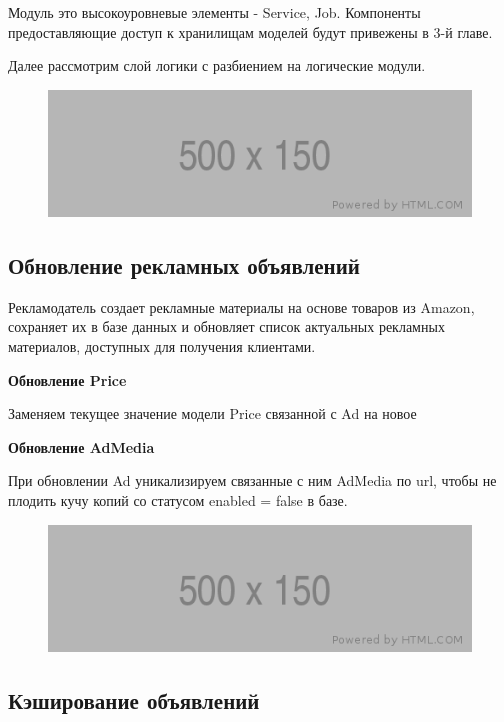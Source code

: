 \documentclass[times]{itmo-student-thesis}
\begin{document}
Модуль это высокоуровневые элементы - Service, Job. Компоненты предоставляющие доступ к хранилищам моделей будут привежены в 3-й главе.

Далее рассмотрим слой логики с разбиением на логические модули.

\begin{figure}[h]
\includegraphics[width=\textwidth]{placeholder}
\centering
\end{figure}

\subsection{Обновление рекламных объявлений}

Рекламодатель создает рекламные материалы на основе товаров из Amazon, сохраняет их в базе данных и обновляет список актуальных рекламных материалов, доступных для получения клиентами.

\textbf{Обновление Price}

Заменяем текущее значение модели Price связанной с Ad на новое

\textbf{Обновление AdMedia}

При обновлении Ad уникализируем связанные с ним AdMedia по url, чтобы не плодить кучу копий со статусом enabled = false в базе.

\begin{figure}[h]
\includegraphics[width=\textwidth]{placeholder}
\centering
\end{figure}

\subsection{Кэширование объявлений}
\end{document}
